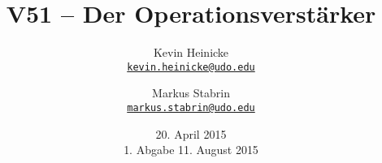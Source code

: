 


\title{%
    V51 -- Der Operationsverstärker
}
\author{%
    Kevin Heinicke\\
    \texttt{\href{mailto:kevin.heinicke@udo.edu}{kevin.heinicke@udo.edu}}
    \and
    Markus Stabrin\\
    \texttt{\href{mailto:markus.stabrin@udo.edu}{markus.stabrin@udo.edu}}
}
\date{%
    20. April 2015\\
    {\small 1. Abgabe} 11. August 2015
}

    \maketitle%
    \tableofcontents
    \newpage
    

    \printbibliography

